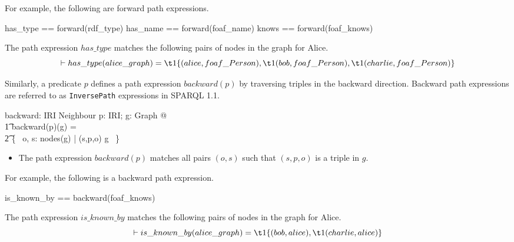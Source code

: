 \documentclass{article}
\begin{document}
For example, the following are forward path expressions.
\begin{zed}
	has\_type == forward(rdf\_type)
\also
	has\_name == forward(foaf\_name)
\also
	knows == forward(foaf\_knows)
\end{zed}

The path expression $has\_type$ matches the following pairs of nodes in the graph for Alice.
\[\vdash
	has\_type(alice\_graph) = \\
\t1		\{ (alice, foaf\_Person), \\
\t1		(bob, foaf\_Person), \\
\t1		(charlie, foaf\_Person) \}
\]

Similarly, a predicate $p$ defines a path expression $backward(p)$ by traversing triples in the backward direction.
Backward path expressions are referred to as {\tt InversePath} expressions in SPARQL 1.1.
\begin{axdef}
	backward: IRI \fun Neighbour
\where
	\forall p: IRI; g: Graph @ \\
\t1		backward(p)(g) = \\
\t2			\{~ o, s: nodes(g) | (s,p,o) \in g ~\}
\end{axdef}
\begin{itemize}
\item The path expression $backward(p)$ matches all pairs $(o,s)$ such that $(s,p,o)$ is a triple in $g$.
\end{itemize}

For example, the following is a backward path expression.
\begin{zed}
	is\_known\_by == backward(foaf\_knows)
\end{zed}

The path expression $is\_known\_by$ matches the following pairs of nodes in the graph for Alice.
\[\vdash 
	is\_known\_by(alice\_graph) = \\
\t1		\{ (bob, alice), \\
\t1		(charlie, alice) \}
\]
\end{document}
